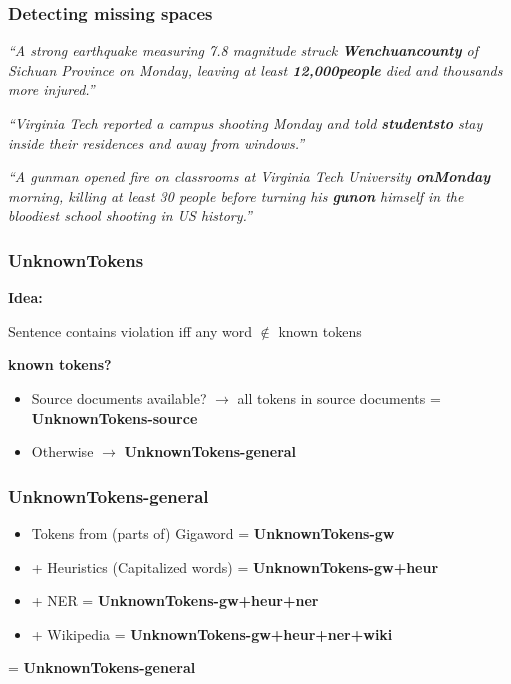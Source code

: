 \documentclass[table]{beamer}
\begin{document}
\begin{frame}
  \frametitle{Detecting missing spaces}
  \textit{``A strong earthquake measuring 7.8 magnitude struck \textbf{Wenchuancounty} of Sichuan Province on Monday, leaving at least \textbf{12,000people} died and thousands more injured.''}

  \vspace{0.5cm}
  \textit{``Virginia Tech reported a campus shooting Monday and told \textbf{studentsto} stay inside their residences and away from windows.''}

  \vspace{0.5cm}
  \textit{``A gunman opened fire on classrooms at Virginia Tech University \textbf{onMonday} morning, killing at least 30 people before turning his \textbf{gunon} himself in the bloodiest school shooting in US history.''}
\end{frame}

\begin{frame}
  \frametitle{\textbf{UnknownTokens}}
  \textbf{Idea:}

  Sentence contains violation iff any word $\not\in$ known tokens
  \pause
  \vspace{0.6cm}

  \textbf{known tokens?}
  \begin{itemize}
    \item Source documents available? $\rightarrow$ all tokens in source documents = \textbf{UnknownTokens-source}
    \item Otherwise $\rightarrow$ \textbf{UnknownTokens-general}
  \end{itemize}
\end{frame}

\begin{frame}
  \frametitle{\textbf{UnknownTokens-general}}
  \begin{itemize}
    \item Tokens from (parts of) Gigaword = \textbf{UnknownTokens-gw}\pause
    \item + Heuristics (Capitalized words) = \textbf{UnknownTokens-gw+heur}\pause
    \item + NER \citep{stanfordNER} = \textbf{UnknownTokens-gw+heur+ner}\pause
    \item + Wikipedia = \textbf{UnknownTokens-gw+heur+ner+wiki}
  \end{itemize}

  = \textbf{UnknownTokens-general}
\end{frame}
\end{document}
